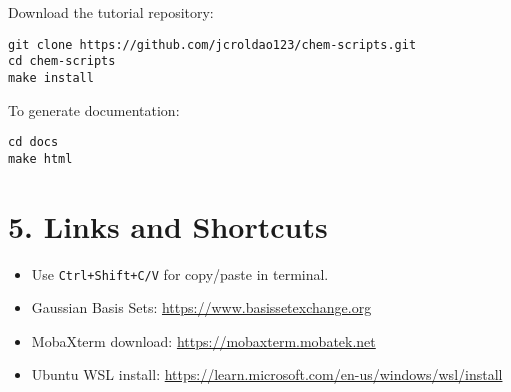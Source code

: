 Download the tutorial repository:

\begin{verbatim}
git clone https://github.com/jcroldao123/chem-scripts.git
cd chem-scripts
make install
\end{verbatim}

To generate documentation:

\begin{verbatim}
cd docs
make html
\end{verbatim}

\section*{5. Links and Shortcuts}

\begin{itemize}
  \item Use \texttt{Ctrl+Shift+C/V} for copy/paste in terminal.
  \item Gaussian Basis Sets: \url{https://www.basissetexchange.org}
  \item MobaXterm download: \url{https://mobaxterm.mobatek.net}
  \item Ubuntu WSL install: \url{https://learn.microsoft.com/en-us/windows/wsl/install}
\end{itemize}
